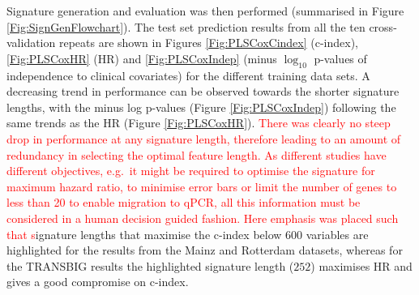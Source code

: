 \documentclass[letterpaper,12pt]{article}
\begin{document}
Signature generation and evaluation was then performed (summarised in Figure \ref{Fig:SignGenFlowchart}). The test set prediction results from all the ten cross-validation repeats are shown in Figures \ref{Fig:PLSCoxCindex} (c-index), \ref{Fig:PLSCoxHR} (HR) and \ref{Fig:PLSCoxIndep} (minus $\log_{10}$ p-values of independence to clinical covariates) for the different training data sets. A decreasing trend in performance can be observed towards the shorter signature lengths, with the minus log p-values (Figure \ref{Fig:PLSCoxIndep}) following the same trends as the HR (Figure \ref{Fig:PLSCoxHR}). \textcolor{red}{There was clearly no steep drop in performance at any signature length, therefore leading to an amount of redundancy in selecting the optimal feature length. As different studies have different objectives, e.g.\ it might be required to optimise the signature for maximum hazard ratio, to minimise error bars or limit the number of genes to less than 20 to enable migration to qPCR, all this information must be considered in a human decision guided fashion. Here emphasis was placed such that s}ignature lengths that maximise the c-index below $600$ variables are highlighted for the results from the Mainz and Rotterdam datasets, whereas for the TRANSBIG results the highlighted signature length ($252$) maximises HR and gives a good compromise on c-index.


%
%
\end{document}
